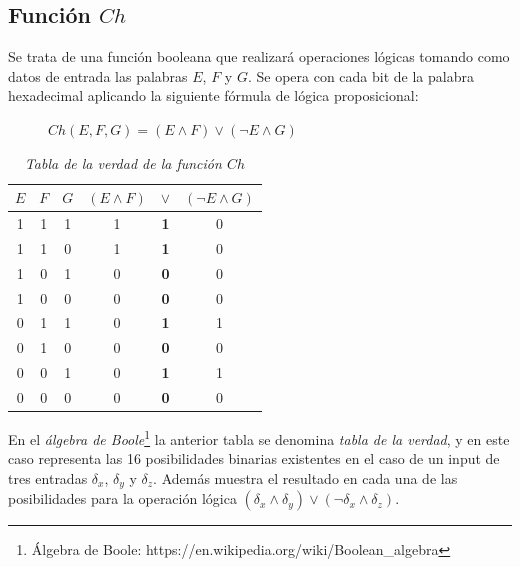 \documentclass{article}
\begin{document}
    \subsection{Función $Ch$}
        Se trata de una función booleana que realizará operaciones lógicas tomando como datos de entrada las palabras $E$, $F$ y $G$. Se opera con cada bit de la palabra hexadecimal aplicando la siguiente fórmula de lógica proposicional:
            \begin{figure}[H]
            \centering
                $Ch(E, F, G) = (E \land F) \lor (\lnot E \land G)$
            \end{figure}
            \begin{table}[H]
            \centering
            \begin{tabular}{| c c c | c c c |} 
                \hline
                $E$ & $F$ & $G$ & $(E \land F)$ & $\lor$ & $(\lnot E \land G)$ \\
                \hline
                1 & 1 & 1 & 1 & \textbf1 & 0 \\
                1 & 1 & 0 & 1 & \textbf1 & 0 \\
                1 & 0 & 1 & 0 & \textbf0 & 0 \\
                1 & 0 & 0 & 0 & \textbf0 & 0 \\
                0 & 1 & 1 & 0 & \textbf1 & 1 \\
                0 & 1 & 0 & 0 & \textbf0 & 0 \\
                0 & 0 & 1 & 0 & \textbf1 & 1 \\
                0 & 0 & 0 & 0 & \textbf0 & 0 \\
                \hline
            \end{tabular}
            \caption{\textit{Tabla de la verdad de la función $Ch$}}
            \label{table:1}
            \end{table}
        En el \textit{álgebra de Boole}\footnote{Álgebra de Boole: https://en.wikipedia.org/wiki/Boolean\_algebra} la anterior tabla se denomina \textit{tabla de la verdad}, y en este caso representa las 16 posibilidades binarias existentes en el caso de un input de tres entradas $\delta_{x}$, $\delta_{y}$ y $\delta_{z}$. Además muestra el resultado en cada una de las posibilidades para la operación lógica $(\delta_{x} \land \delta_{y}) \lor (\lnot \delta_{x} \land \delta_{z})$.
        
\end{document}
